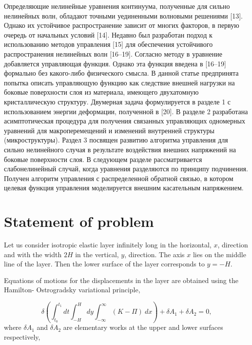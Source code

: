 Определяющие нелинейные уравнения континуума, полученные для сильно нелинейных волн, обладают точными уединенными волновыми решениями [13]. Однако их устойчивое распространение зависит от многих факторов, в первую очередь от начальных условий [14]. Недавно был разработан подход к использованию методов управления [15] для обеспечения устойчивого распространения нелинейных волн [16–19]. Согласно методу в уравнение добавляется управляющая функция. Однако эта функция введена в [16–19] формально без какого-либо физического смысла. В данной статье предпринята попытка описать управляющую функцию как следствие внешней нагрузки на боковые поверхности слоя из материала, имеющего двухатомную кристаллическую структуру. Двумерная задача формулируется в разделе 1 с использованием энергии деформации, полученной в [20]. В разделе 2 разработана асимптотическая процедура для получения связанных управляющих одномерных уравнений для макроперемещений и изменений внутренней структуры (микроструктуры). Раздел 3 посвящен развитию алгоритма управления для сильно нелинейного случая в результате воздействия внешних напряжений на боковые поверхности слоя. В следующем разделе рассматривается слабонелинейный случай, когда уравнения разделяются по принципу подчинения. Получен алгоритм управления с распределенной обратной связью, в котором целевая функция управления моделируется внешним касательным напряжением. 

\section{Statement of problem}

Let us consider isotropic elastic layer infinitely long  in the horizontal,  $x$,  direction and  with the width $2 H$ in the vertical,  $y$,  direction. The axis $x$ lies on the middle line of the layer. Then the lower surface of the layer corresponds to $y=-H$. 

Equations of motions for the displacements in the layer are obtained using the Hamilton- Ostrogradsky variational principle,

\begin{equation}
	\delta \left( \int_{t_0}^{t_1}dt \int_{-H}^{H} dy \int_{-\infty}^{\infty}\left( K - \Pi \right)  \:   dx \right)+ \delta A_1 + \delta A_2=0, \label{var}
\end{equation}
where $ \delta A_1$ and $\delta A_2$ are elementary works at the upper and lower surfaces respectively,


